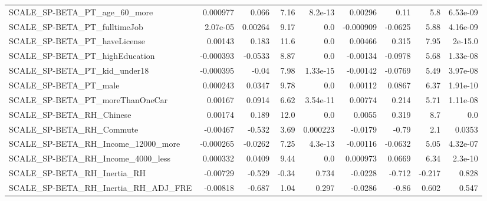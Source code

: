 \begin{tabular}{lrrrrrrrr}
SCALE\_SP-BETA\_PT\_age\_60\_more                       &    0.000977 &        0.066 &     7.16 &  8.2e-13 &    0.00296 &        0.11 &          5.8 &      6.53e-09 \\
SCALE\_SP-BETA\_PT\_fulltimeJob                       &    2.07e-05 &      0.00264 &     9.17 &      0.0 &  -0.000909 &     -0.0625 &         5.88 &      4.16e-09 \\
SCALE\_SP-BETA\_PT\_haveLicense                       &     0.00143 &        0.183 &     11.6 &      0.0 &    0.00466 &       0.315 &         7.95 &       2e-15.0 \\
SCALE\_SP-BETA\_PT\_highEducation                     &   -0.000393 &      -0.0533 &     8.87 &      0.0 &   -0.00134 &     -0.0978 &         5.68 &      1.33e-08 \\
SCALE\_SP-BETA\_PT\_kid\_under18                       &   -0.000395 &        -0.04 &     7.98 & 1.33e-15 &   -0.00142 &     -0.0769 &         5.49 &      3.97e-08 \\
SCALE\_SP-BETA\_PT\_male                              &    0.000243 &       0.0347 &     9.78 &      0.0 &    0.00112 &      0.0867 &         6.37 &      1.91e-10 \\
SCALE\_SP-BETA\_PT\_moreThanOneCar                    &     0.00167 &       0.0914 &     6.62 & 3.54e-11 &    0.00774 &       0.214 &         5.71 &      1.11e-08 \\
SCALE\_SP-BETA\_RH\_Chinese                           &     0.00174 &        0.189 &     12.0 &      0.0 &     0.0055 &       0.319 &          8.7 &           0.0 \\
SCALE\_SP-BETA\_RH\_Commute                           &    -0.00467 &       -0.532 &     3.69 & 0.000223 &    -0.0179 &       -0.79 &          2.1 &        0.0353 \\
SCALE\_SP-BETA\_RH\_Income\_12000\_more                 &   -0.000265 &      -0.0262 &     7.25 &  4.3e-13 &   -0.00116 &     -0.0632 &         5.05 &      4.32e-07 \\
SCALE\_SP-BETA\_RH\_Income\_4000\_less                  &    0.000332 &       0.0409 &     9.44 &      0.0 &   0.000973 &      0.0669 &         6.34 &       2.3e-10 \\
SCALE\_SP-BETA\_RH\_Inertia\_RH                        &    -0.00729 &       -0.529 &    -0.34 &    0.734 &    -0.0228 &      -0.712 &       -0.217 &         0.828 \\
SCALE\_SP-BETA\_RH\_Inertia\_RH\_ADJ\_FRE                &    -0.00818 &       -0.687 &     1.04 &    0.297 &    -0.0286 &       -0.86 &        0.602 &         0.547 \\

\end{tabular}
